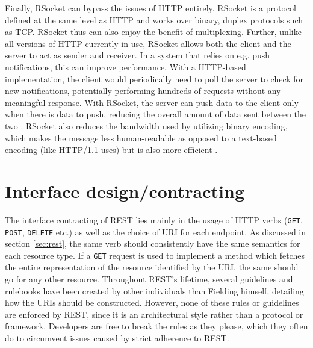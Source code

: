 Finally, RSocket can bypass the issues of HTTP entirely. RSocket is a protocol defined at the same level as HTTP and works over binary, duplex protocols such as TCP. RSocket thus can also enjoy the benefit of multiplexing. Further, unlike all versions of HTTP currently in use, RSocket allows both the client and the server to act as sender and receiver. In a system that relies on e.g. push notifications, this can improve performance. With a HTTP-based implementation, the client would periodically need to poll the server to check for new notifications, potentially performing hundreds of requests without any meaningful response. With RSocket, the server can push data to the client only when there is data to push, reducing the overall amount of data sent between the two \cite{rsocketmotivations}. RSocket also reduces the bandwidth used by utilizing binary encoding, which makes the message less human-readable as opposed to a text-based encoding (like HTTP/1.1 uses) but is also more efficient \cite{ng2005study}.

\section{Interface design/contracting}
The interface contracting of REST lies mainly in the usage of HTTP verbs (\texttt{GET}, \texttt{POST}, \texttt{DELETE} etc.) as well as the choice of URI for each endpoint. As discussed in section \ref{sec:rest}, the same verb should consistently have the same semantics for each resource type. If a \texttt{GET} request is used to implement a method which fetches the entire representation of the resource identified by the URI, the same should go for any other resource. Throughout REST's lifetime, several guidelines and rulebooks have been created by other individuals than Fielding himself, detailing how the URIs should be constructed. However, none of these rules or guidelines are enforced by REST, since it is an architectural style rather than a protocol or framework. Developers are free to break the rules as they please, which they often do to circumvent issues caused by strict adherence to REST.

